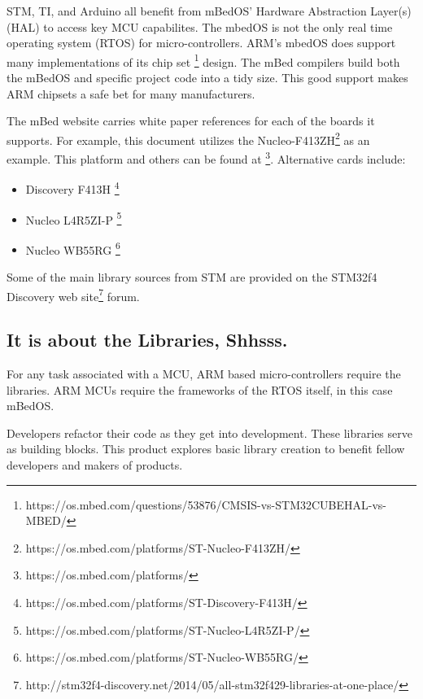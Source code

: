 \documentclass{article}
\begin{document}
STM, TI, and Arduino all benefit from mBedOS' Hardware Abstraction Layer(s)(HAL) to access key MCU capabilites.  The mbedOS is not the only real time operating system (RTOS) for micro-controllers.  ARM's mbedOS does support many implementations of its chip set \footnote{https://os.mbed.com/questions/53876/CMSIS-vs-STM32CUBEHAL-vs-MBED/} design.  The mBed compilers build both the mBedOS and specific project code into a tidy size.  This good support makes ARM chipsets a safe bet for many manufacturers.


The mBed website carries white paper references for each of the boards it supports.  For example, this document utilizes the Nucleo-F413ZH\footnote{https://os.mbed.com/platforms/ST-Nucleo-F413ZH/} as an example.  This platform and others can be found at \footnote{https://os.mbed.com/platforms/}.
Alternative cards include:
\begin{itemize}
	\item Discovery F413H \footnote{https://os.mbed.com/platforms/ST-Discovery-F413H/}
	\item Nucleo L4R5ZI-P \footnote{https://os.mbed.com/platforms/ST-Nucleo-L4R5ZI-P/}
	\item Nucleo WB55RG \footnote{https://os.mbed.com/platforms/ST-Nucleo-WB55RG/}
\end{itemize}

Some of the main library sources from STM are provided on the STM32f4 Discovery web site\footnote{http://stm32f4-discovery.net/2014/05/all-stm32f429-libraries-at-one-place/} forum.  



\subsection{It is about the Libraries, Shhsss.} %
\label{sub:it_is_about_the_libraries_shhsss}

For any task associated with a MCU, ARM based micro-controllers require the libraries. ARM MCUs require the frameworks of the RTOS itself, in this case mBedOS. 

Developers refactor their code as they get into development. These libraries serve as building blocks. This product explores basic library creation to benefit fellow developers and makers of products. 
\end{document}
